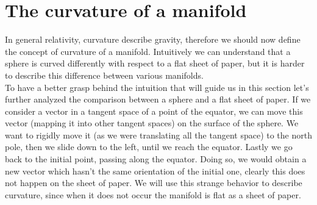 \section{The curvature of a manifold}
In general relativity, curvature describe gravity, therefore we should now define the concept of curvature of a manifold. Intuitively we can understand that a sphere is curved differently with respect to a flat sheet of paper, but it is harder to describe this difference between various manifolds.\\

To have a better grasp behind the intuition that will guide us in this section let's further analyzed the comparison between a sphere and a flat sheet of paper. If we consider a vector in a tangent space of a point of the equator, we can move this vector (mapping it into other tangent spaces) on the surface of the sphere. We want to rigidly move it (as we were translating all the tangent space) to the north pole, then we slide down to the left, until we reach the equator. Lastly we go back to the initial point, passing along the equator. Doing so, we would obtain a new vector which hasn't the same orientation of the initial one, clearly this does not happen on the sheet of paper. We will use this strange behavior to describe curvature, since when it does not occur the manifold is flat as a sheet of paper.
